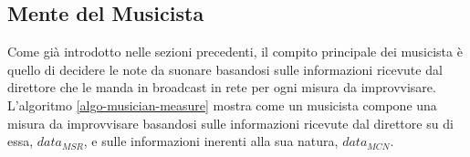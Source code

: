 \subsection{Mente del Musicista}
%   	
%
%
%   	
%
\label{sec:musician_think}
Come già introdotto nelle sezioni precedenti, il compito principale dei musicista è
quello di decidere le note da suonare basandosi sulle informazioni
ricevute dal direttore che le manda in broadcast in rete per ogni misura
da improvvisare. L'algoritmo \ref{algo-musician-measure} mostra come un
musicista compone una misura da improvvisare basandosi sulle
informazioni ricevute dal direttore su di essa, $data_{MSR}$, e sulle
informazioni inerenti alla sua natura, $data_{MCN}$. 

